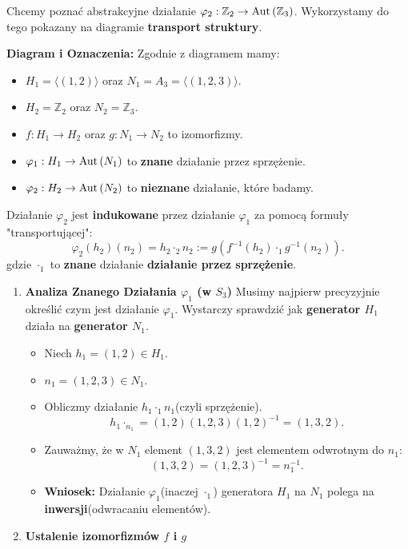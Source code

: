 \begin{goall}
	Chcemy poznać abstrakcyjne działanie $\varphi_2: \mathbb{Z}_2 \rightarrow \operatorname{Aut}\left(\mathbb{Z}_3\right) $. Wykorzystamy do tego pokazany na diagramie \textbf{transport struktury}.  


	\textbf{Diagram i Oznaczenia:} Zgodnie z diagramem mamy:
	\begin{itemize}
		\item $H_1 = \langle \left( 1,2 \right)  \rangle $ oraz $N_1 = A_3 = \langle \left( 1,2,3 \right)  \rangle $.
		\item $H_2 = \mathbb{Z}_2$ oraz $N_2 =\mathbb{Z}_3$.
		\item $f: H_1\rightarrow H_2$ oraz $g: N_1 \rightarrow N_2$ to izomorfizmy.
		\item $\varphi_1: H_1 \rightarrow \operatorname{Aut}\left(N_1\right) $ to \textbf{znane} działanie przez sprzężenie.
		\item $\varphi_2: H_2 \rightarrow \operatorname{Aut}\left(N_2\right) $ to \textbf{nieznane} działanie, które badamy.
	\end{itemize}

	Działanie $\varphi_2$ jest \textbf{indukowane} przez działanie $\varphi_1$ za pomocą formuły "transportującej":
	\[
	\varphi_2\left( h_2 \right)\left( n_2 \right) = h_2\cdot _{2}n_2 := g\left( f^{-1}\left( h_2 \right) \cdot _{1} g^{-1}\left( n_2 \right)  \right) 
	.\] 
gdzie $\cdot _{1}$ to \textbf{znane} działanie \textbf{działanie przez sprzężenie}.
\begin{enumerate}[label=\textbf{Krok \arabic*.}, wide]
	\item \textbf{Analiza Znanego Działania $\varphi_1$ (w $S_3$)} 
	Musimy najpierw precyzyjnie określić czym jest działanie $\varphi_1$. Wystarczy sprawdzić jak \textbf{generator $H_1$} działa na \textbf{generator $N_1$}. 
	\begin{itemize}
		\item Niech $h_1 = \left( 1,2 \right) \in H_1.$
		\item $n_1 = \left( 1,2,3 \right) \in N_1$.
		\item Obliczmy działanie $h_1 \cdot_1 n_1$(czyli sprzężenie).
			\[
			h_1\cdot _{n_1} = \left( 1,2 \right) \left( 1,2,3 \right) \left( 1,2 \right) ^{-1} = \left( 1,3,2 \right) 
			.\] 
		\item Zauważmy, że w $N_1$ element $\left( 1,3,2 \right) $ jest elementem odwrotnym do $n_1$: 
			\[
			\left( 1,3,2 \right) = \left( 1,2,3 \right) ^{-1} = n_1^{-1} 
			.\] 

		\item \textbf{Wniosek:} Działanie $\varphi_1$(inaczej $\cdot_{1}$) generatora $H_1$ na $N_1$ polega na  \textbf{inwersji}(odwracaniu elementów).  
	\end{itemize}
\item \textbf{Ustalenie izomorfizmów $f$ i $g$} 


\end{enumerate}
\end{goall}
